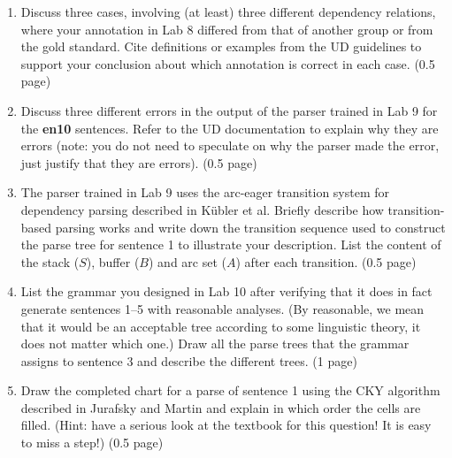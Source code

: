 \documentclass[11pt]{article}
\begin{document}
\begin{enumerate}[itemsep=3pt]
\item Discuss three cases, involving (at least) three different dependency relations, where your annotation in Lab 8 differed from that of another group or from the gold standard. 
Cite definitions or examples from the UD guidelines to support your conclusion about which annotation is correct in each case. (0.5 page) 
\item Discuss three different errors in the output of the parser trained in Lab 9 for the \textbf{en10} sentences. Refer to the UD documentation to explain why they are errors (note: you do not need to speculate on why the parser made the error, just justify that they are errors). (0.5 page)
\item The parser trained in Lab 9 uses the arc-eager transition system for dependency parsing described in K\"{u}bler et al. Briefly describe how transition-based parsing works and write down the transition sequence used to construct the parse tree for sentence 1 to illustrate your description. List the content of the stack ($S$), buffer ($B$) and arc set ($A$) after each transition. (0.5 page)
\item List the grammar you designed in Lab 10 after verifying that it does in fact generate sentences 1--5 with reasonable analyses. (By reasonable, we mean that it would be an acceptable tree according to some linguistic theory, it does not matter which one.) Draw all the parse trees that the grammar assigns to sentence 3 and describe the different trees. (1 page) 
\item Draw the completed chart for a parse of sentence 1 using the CKY algorithm described in Jurafsky and Martin and explain in which order the cells are filled. (Hint: have a serious look at the textbook for this question! It is easy to miss a step!) (0.5 page)
\end{enumerate}
\end{document}
